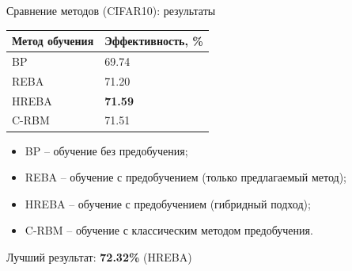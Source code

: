 \documentclass[10pt]{beamer}
\begin{document}
        \begin{frame}{Сравнение методов (CIFAR10): результаты}
            \begin{table} [!h]
              \small
            \centering
            \begin{tabular}{| p{3cm} | p{3cm} |}
              \hline
                \textbf{Метод обучения} & \textbf{Эффективность, \%}\\
                \hline
                BP & 69.74\\
                \hline
                REBA & 71.20\\
                \hline
                HREBA & \textbf{71.59}\\
                \hline
                C-RBM & 71.51\\
                \hline
            \end{tabular}
            \end{table}
            \begin{itemize}
                \item BP -- обучение без предобучения; 
                \item REBA -- обучение с предобучением (только предлагаемый метод);  
                \item HREBA -- обучение с предобучением (гибридный подход);
                \item C-RBM -- обучение с классическим методом предобучения.
            \end{itemize}
            Лучший результат: \textbf{72.32\%} (HREBA)\\

        \end{frame}
\end{document}
